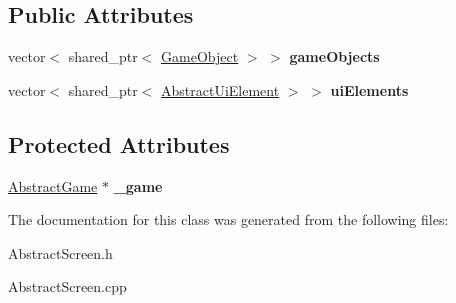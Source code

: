 \subsection*{Public Attributes}
\begin{DoxyCompactItemize}
\item 
\mbox{\label{class_abstract_screen_a4898cec711e7cdc71bcc46399e4e1a4e}} 
vector$<$ shared\+\_\+ptr$<$ \mbox{\hyperlink{class_game_object}{Game\+Object}} $>$ $>$ {\bfseries game\+Objects}
\item 
\mbox{\label{class_abstract_screen_a09109f46ca7d8662cf0b2d6c49931196}} 
vector$<$ shared\+\_\+ptr$<$ \mbox{\hyperlink{class_abstract_ui_element}{Abstract\+Ui\+Element}} $>$ $>$ {\bfseries ui\+Elements}
\end{DoxyCompactItemize}
\subsection*{Protected Attributes}
\begin{DoxyCompactItemize}
\item 
\mbox{\label{class_abstract_screen_ade20515e2fc913122f74f1989b41c15c}} 
\mbox{\hyperlink{class_abstract_game}{Abstract\+Game}} $\ast$ {\bfseries \+\_\+game}
\end{DoxyCompactItemize}


The documentation for this class was generated from the following files\+:\begin{DoxyCompactItemize}
\item 
Abstract\+Screen.\+h\item 
Abstract\+Screen.\+cpp\end{DoxyCompactItemize}
